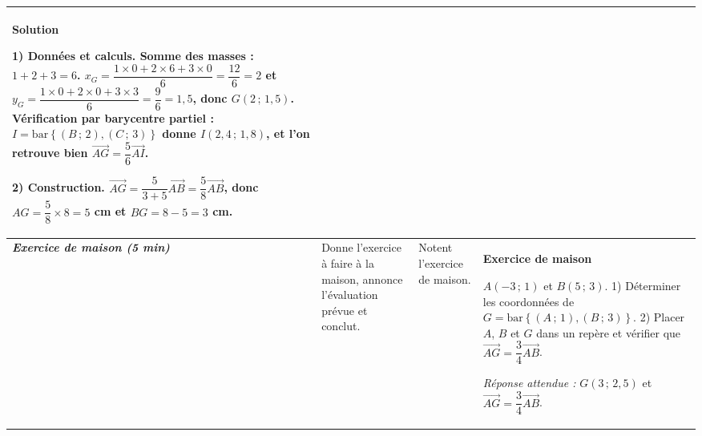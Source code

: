 \documentclass[10pt,a4paper,landscape]{article}
\newcommand{\vc}[1]{\overrightarrow{#1}}                                 %
\newcommand{\barG}[1]{\mathrm{bar}\left\{#1\right\}}                      %
\newcommand{\bleu}[1]{{\color{cBleu}\bfseries #1}}                        %
\newcommand{\moment}[1]{\textbf{\itshape #1}}                             %
\begin{document}
{\begin{longtable}{|J{2.12cm}|L{5.17cm}|L{4.37cm}|L{13.64cm}|}
\bleu{Solution}

\textbf{1) Données et calculs.} Somme des masses : $1+2+3=6$.
$x_G=\dfrac{1\times 0+2\times 6+3\times 0}{6}=\dfrac{12}{6}=2$ et $y_G=\dfrac{1\times 0+2\times 0+3\times
3}{6}=\dfrac{9}{6}=1{,}5$, donc $G(2\,;\,1{,}5)$.
\textbf{Vérification par barycentre partiel :} $I=\barG{(B\,;\,2),(C\,;\,3)}$ donne $I(2{,}4\,;\,1{,}8)$, et
l'on retrouve bien $\vc{AG}=\dfrac{5}{6}\vc{AI}$.

\textbf{2) Construction.} $\vc{AG}=\dfrac{5}{3+5}\vc{AB}=\dfrac{5}{8}\vc{AB}$, donc $AG=\dfrac{5}{8}\times 8=5$
cm et $BG=8-5=3$ cm.
\\
\hline
\moment{Exercice de maison (5 min)} &
Donne l'exercice à faire à la maison, annonce l'évaluation prévue et conclut. &
Notent l'exercice de maison. &
\bleu{Exercice de maison}

$A(-3\,;\,1)$ et $B(5\,;\,3)$.
1) Déterminer les coordonnées de $G=\barG{(A\,;\,1),(B\,;\,3)}$.
2) Placer $A$, $B$ et $G$ dans un repère et vérifier que $\vc{AG}=\dfrac{3}{4}\vc{AB}$.

\emph{Réponse attendue :} $G(3\,;\,2{,}5)$ et $\vc{AG}=\dfrac{3}{4}\vc{AB}$.
\\
\hline
\end{longtable}}
\end{document}
